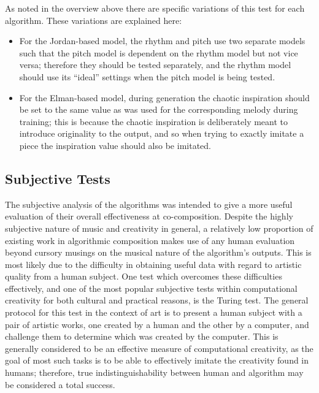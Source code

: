 \documentclass[ author={Stephen Livermore-Tozer},
				supervisor={Dr. Peter Flach},
				degree={MEng},
				title={Algorithmic Co-composition Using Machine Learning},
				subtitle={},
				type={research},
				year={2016} ]{dissertation}
\begin{document}
	As noted in the overview above there are specific variations of this test for each algorithm. These variations are explained here:
	\begin{itemize}
		\item For the Jordan-based model, the rhythm and pitch use two separate models such that the pitch model is dependent on the rhythm model but not vice versa; therefore they should be tested separately, and the rhythm model should use its ``ideal'' settings when the pitch model is being tested.
		\item For the Elman-based model, during generation the chaotic inspiration should be set to the same value as was used for the corresponding melody during training; this is because the chaotic inspiration is deliberately meant to introduce originality to the output, and so when trying to exactly imitate a piece the inspiration value should also be imitated.
	\end{itemize}
	
	\subsection{Subjective Tests}
	\label{sec:subjective-analysis}
	
	The subjective analysis of the algorithms was intended to give a more useful evaluation of their overall effectiveness at co-composition. Despite the highly subjective nature of music and creativity in general, a relatively low proportion of existing work in algorithmic composition makes use of any human evaluation beyond cursory musings on the musical nature of the algorithm's outputs. This is most likely due to the difficulty in obtaining useful data with regard to artistic quality from a human subject. One test which overcomes these difficulties effectively, and one of the most popular subjective tests within computational creativity for both cultural and practical reasons, is the Turing test. The general protocol for this test in the context of art is to present a human subject with a pair of artistic works, one created by a human and the other by a computer, and challenge them to determine which was created by the computer. This is generally considered to be an effective measure of computational creativity, as the goal of most such tasks is to be able to effectively imitate the creativity found in humans; therefore, true indistinguishability between human and algorithm may be considered a total success.
	
\end{document}
